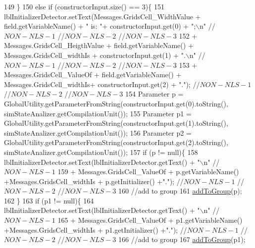 \begin{DoxyCode}
149         \}
150         \textcolor{keywordflow}{else} \textcolor{keywordflow}{if} (constructorInput.size() == 3)\{
151             lblInitializerDetector.setText(Messages.GridsCell\_WidthValue + field.getVariableName() + \textcolor{stringliteral}{" is: 
      "}+ constructorInput.get(0) + \textcolor{stringliteral}{";\(\backslash\)n"} \textcolor{comment}{//$NON-NLS-1$ //$NON-NLS-2$ //$NON-NLS-3$}
152                     + Messages.GridsCell\_HeigthValue + field.getVariableName() + Messages.GridsCell\_widthIs
       + constructorInput.get(1) + \textcolor{stringliteral}{".\(\backslash\)n"} \textcolor{comment}{//$NON-NLS-1$ //$NON-NLS-2$ //$NON-NLS-3$}
153                     + Messages.GridsCell\_ValueOf + field.getVariableName() + Messages.GridsCell\_widthIs+ 
      constructorInput.get(2) + \textcolor{stringliteral}{"."}); \textcolor{comment}{//$NON-NLS-1$ //$NON-NLS-2$ //$NON-NLS-3$}
154             Parameter p = GlobalUtility.getParameterFromString(constructorInput.get(0).toString(), 
      simStateAnalizer.getCompilationUnit());
155             Parameter p1 = GlobalUtility.getParameterFromString(constructorInput.get(1).toString(), 
      simStateAnalizer.getCompilationUnit());
156             Parameter p2 = GlobalUtility.getParameterFromString(constructorInput.get(2).toString(), 
      simStateAnalizer.getCompilationUnit());
157             \textcolor{keywordflow}{if} (p != null)\{ 
158                 lblInitializerDetector.setText(lblInitializerDetector.getText() + \textcolor{stringliteral}{"\(\backslash\)n"} \textcolor{comment}{//$NON-NLS-1$}
159                     +  Messages.GridsCell\_ValueOf + p.getVariableName() +Messages.GridsCell\_widthIs + 
      p.getInitializer() +\textcolor{stringliteral}{"."}); \textcolor{comment}{//$NON-NLS-1$ //$NON-NLS-2$ //$NON-NLS-3$}
160                 \textcolor{comment}{//add to group}
161                 \hyperlink{classit_1_1isislab_1_1masonhelperdocumentation_1_1mason_1_1wizards_1_1_g___grids_cell_page_a43c0ab8367d25f1cfd0cdc9e29f46e5c}{addToGroup}(p);
162             \}
163             \textcolor{keywordflow}{if} (p1 != null)\{    
164                 lblInitializerDetector.setText(lblInitializerDetector.getText() + \textcolor{stringliteral}{"\(\backslash\)n"} \textcolor{comment}{//$NON-NLS-1$}
165                     +  Messages.GridsCell\_ValueOf + p1.getVariableName() +Messages.GridsCell\_widthIs + 
      p1.getInitializer() +\textcolor{stringliteral}{"."}); \textcolor{comment}{//$NON-NLS-1$ //$NON-NLS-2$ //$NON-NLS-3$}
166                 \textcolor{comment}{//add to group}
167                 \hyperlink{classit_1_1isislab_1_1masonhelperdocumentation_1_1mason_1_1wizards_1_1_g___grids_cell_page_a43c0ab8367d25f1cfd0cdc9e29f46e5c}{addToGroup}(p1);

\end{DoxyCode}

